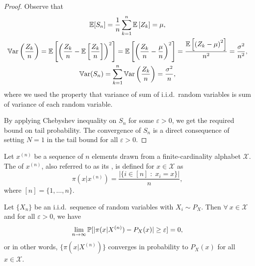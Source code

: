 \documentclass[11pt,a4paper]{article}
\begin{document}
\begin{proof}
    Observe that 
    \begin{gather*}
        \mathbb{E}[S_n] = \dfrac{1}{n}\sum_{k=1}^n \mathbb{E}\left[ Z_k \right] = \mu, \\
        \mathbb{V}\text{ar}\left(\dfrac{Z_k}{n}\right) = \mathbb{E}\left[\left( \dfrac{Z_k}{n} - \mathbb{E}\left[ \dfrac{Z_k}{n} \right]\right)^2 \right] = \mathbb{E}\left[\left( \dfrac{Z_k}{n} - \dfrac{\mu}{n} \right)^2\right] = \dfrac{\mathbb{E}\left[\left( Z_k - \mu \right)^2\right]}{n^2} = \dfrac{\sigma^2}{n^2}, \\
        \mathbb{V}\text{ar}(S_n) = \sum_{k=1}^{n} \mathbb{V}\text{ar}\left(\dfrac{Z_k}{n}\right) = \dfrac{\sigma^2}{n},
    \end{gather*}
    where we used the property that variance of sum of i.i.d.~random variables is sum of variance of each random variable.

    By applying Chebyshev inequality on $S_n$ for some $\varepsilon > 0$, we get the required bound on tail probability. {\color{magenta} The convergence of $S_n$ is a direct consequence of setting $N = 1$ in the tail bound for all $\varepsilon > 0$.}
\end{proof}

\begin{definition}
    Let $x^{(n)}$ be a sequence of $n$ elements drawn from a finite-cardinality alphabet $\mathcal{X}$. The  of $x^{(n)}$, also referred to as its , is defined for $x\in \mathcal{X}$ as
    \begin{equation*}
        \pi(x|x^{(n)}) = \dfrac{|\{i\in [n]\;:\;x_i = x\}|}{n}, 
    \end{equation*}
    where $[n] = \{1,\ldots, n\}$.
\end{definition}

\begin{theorem}
    Let $\{X_n\}$ be an i.i.d.~sequence of random variables with $X_i\sim P_X$. Then $\forall\ x\in\mathcal{X}$ and for all $\varepsilon>0$, we have
    \begin{equation*}
        \lim_{n\rightarrow \infty} \mathbb{P}[|\pi(x|X^{(n)}) - P_X(x)| \ge \varepsilon] = 0, 
    \end{equation*}
    or in other words, $\{\pi(x|X^{(n)})\}$ converges in probability to $P_X(x)$ for all $x\in\mathcal{X}$.
\end{theorem}
\end{document}

